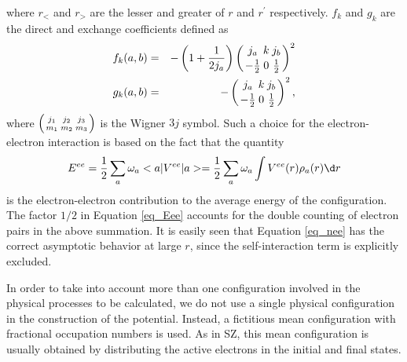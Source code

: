 \documentclass{elsart}
\newcommand{\threej}[6]{\ensuremath{\left({#1\atop #4}{#2\atop #5}
{#3\atop #6}\right)}}
\begin{document}
where $r_<$ and $r_>$ are the lesser and greater of $r$ and $r^\prime$
respectively. $f_k$ and $g_k$ are the direct and exchange coefficients defined
as
\begin{eqnarray}
\label{eq_fg}
f_k(a,b) &=& -\left(1+\frac{1}{2j_a}\right)
\threej{j_a}{k}{j_b}{-\frac{1}{2}}{0}{\frac{1}{2}}^2 \nonumber\\
g_k(a,b) &=& -\threej{j_a}{k}{j_b}{-\frac{1}{2}}{0}{\frac{1}{2}}^2,
\end{eqnarray}
where \threej{j_1}{j_2}{j_3}{m_1}{m_2}{m_3} is the Wigner $3j$ symbol. Such a
choice for the electron-electron interaction is based on the fact that the
quantity 
\begin{equation}
\label{eq_Eee}
E^{ee} = \frac{1}{2}\sum_a\omega_a<a|V^{ee}|a> 
= \frac{1}{2}\sum_a\omega_a\int V^{ee}(r)\rho_a(r)\d r
\end{equation}
is the electron-electron contribution to the average energy of the
configuration. The factor $1/2$ in Equation \ref{eq_Eee} accounts for the
double counting of electron pairs in the above summation. It is easily seen
that Equation \ref{eq_nee} has the correct asymptotic behavior at large $r$,
since the self-interaction term is explicitly excluded.

In order to take into account more than one configuration involved in the
physical processes to be calculated, we do not use a single physical
configuration in the construction of the potential. Instead, a fictitious mean
configuration with fractional occupation numbers is used. As in SZ, this mean
configuration is usually obtained by distributing the active electrons in the
initial and final states. 
 
\end{document}

